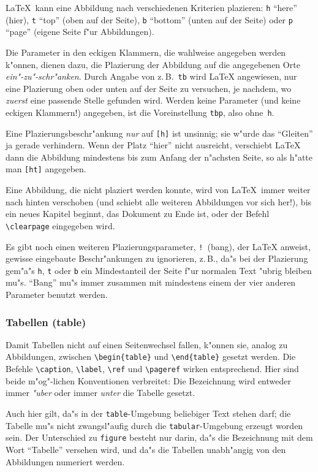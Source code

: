 \LaTeX\ kann eine Abbildung nach verschiedenen Kriterien plazieren:
\texttt{h} "`here"' (hier),
\texttt{t} "`top"' (oben auf der Seite), \texttt{b} "`bottom"' (unten
auf der Seite) oder \texttt{p} "`page"' (eigene Seite f"ur
Abbildungen).

Die Parameter in den eckigen Klammern, die wahlweise angegeben
werden k"onnen, dienen dazu, die Plazierung der Abbildung auf die
angegebenen Orte \emph{ein"-zu"-schr"anken}.  Durch Angabe von
z.\,B.\ \texttt{tb}
wird \LaTeX{} angewiesen, nur eine Plazierung oben oder unten auf der
Seite zu versuchen, je nachdem,
wo \emph{zuerst} eine passende Stelle gefunden wird.
Werden keine Parameter (und keine eckigen
Klammern!) angegeben, ist die Voreinstellung \texttt{tbp},
also ohne~\texttt{h}.

Eine Plazierungsbeschr"ankung \emph{nur} auf \texttt{[h]} ist unsinnig;
sie w"urde das "`Gleiten"' ja gerade verhindern.
Wenn der Platz "`hier"' nicht ausreicht, 
verschiebt \LaTeX{} dann die Abbildung mindestens 
bis zum Anfang der n"achsten Seite, so als h"atte man \texttt{[ht]} angegeben.

Eine Abbildung, die nicht plaziert werden konnte, wird von
\LaTeX\ immer weiter nach hinten verschoben (und schiebt alle
weiteren Abbildungen vor sich her!), bis ein neues Kapitel
beginnt, das Dokument zu Ende ist, oder der Befehl
\verb|\clearpage| eingegeben wird.  


Es gibt noch einen weiteren Plazierungsparameter, 
\texttt{!}\ (bang), der \LaTeX{} anweist, 
gewisse eingebaute Beschr"ankungen zu ignorieren, 
z.\,B., da"s bei der Plazierung gem"a"s \texttt{h}, \texttt{t} oder \texttt{b}
ein Mindestanteil der Seite f"ur normalen Text "ubrig bleiben mu"s.
"`Bang"' mu"s immer zusammen mit mindestens einem der vier
anderen Parameter benutzt werden.  
 


\subsubsection{Tabellen (table)}

\begin{sloppypar}
\relax %

Damit Tabellen nicht auf einen Seitenwechsel fallen,
k"onnen sie, analog zu Abbildungen, zwischen
\verb|\begin{table}| und \verb|\end{table}| gesetzt werden.
Die Befehle
\verb|\caption|, \verb|\label|, \verb|\ref| und \verb|\pageref|
wirken entsprechend.
Hier sind beide m"og"-lichen Konventionen verbreitet: Die
Bezeichnung wird entweder immer \emph{"uber} oder immer
\emph{unter} die Tabelle gesetzt.
\end{sloppypar}

Auch hier gilt, da"s in der \texttt{table}-Umgebung  beliebiger
Text stehen darf; die Tabelle mu"s nicht zwangsl"aufig durch die
\texttt{tabular}-Umgebung erzeugt worden sein.
Der Unterschied zu \texttt{figure} besteht nur darin, 
da"s die Bezeichnung mit dem Wort "`Tabelle"' versehen wird,
und da"s die Tabellen unabh"angig von den Abbildungen numeriert werden.

\endinput
